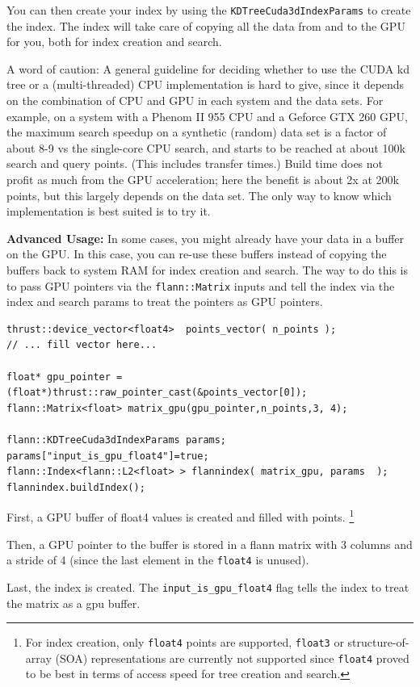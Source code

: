 \documentclass[letter,10pt]{article}
\begin{document}
You can then create your index by using the \texttt{KDTreeCuda3dIndexParams} to create the index. The index will take care of copying all the data from and to the GPU for you, both 
for index creation and search.

A word of caution: A general guideline for deciding whether to use the CUDA kd tree or a (multi-threaded) CPU implementation is hard to give, since it depends on the combination of CPU and GPU in each system and the data sets.
For example, on a system with a Phenom II 955 CPU and a Geforce GTX 260 GPU, the maximum search speedup on a synthetic (random) data set is a factor of about 8-9 vs the single-core CPU search, and starts to be reached at about 100k search and query points. (This includes transfer times.)
Build time does not profit as much from the GPU acceleration; here the benefit is about 2x at 200k points, but this largely depends on the data set. The only way to know which implementation is best suited is to try it.

\textbf{Advanced Usage:}
In some cases, you might already have your data in a buffer on the GPU. In this case, you can re-use these buffers instead of copying the buffers back to system RAM for index creation and search.
The way to do this is to pass GPU pointers via the \texttt{flann::Matrix} inputs and tell the index via the index and search params to treat the pointers as GPU pointers.
\begin{Verbatim}[fontsize=\footnotesize,frame=single]
thrust::device_vector<float4>  points_vector( n_points );
// ... fill vector here...

float* gpu_pointer = (float*)thrust::raw_pointer_cast(&points_vector[0]);
flann::Matrix<float> matrix_gpu(gpu_pointer,n_points,3, 4);

flann::KDTreeCuda3dIndexParams params;
params["input_is_gpu_float4"]=true;
flann::Index<flann::L2<float> > flannindex( matrix_gpu, params  );
flannindex.buildIndex();
\end{Verbatim}
\begin{description}
 \item First, a GPU buffer of float4 values is created and filled with points. \footnote{For index creation, only \texttt{float4} points are supported, \texttt{float3} or structure-of-array (SOA) representations are currently not supported since
\texttt{float4} proved to be best in terms of access speed for tree creation and search.}
 \item Then, a GPU pointer to the buffer is stored in a flann matrix with 3 columns and a stride of 4 (since the last element in the \texttt{float4} is unused).
 \item Last, the index is created. The \texttt{input\_is\_gpu\_float4} flag tells the index to treat the matrix as a gpu buffer.
\end{description}
\end{document}
